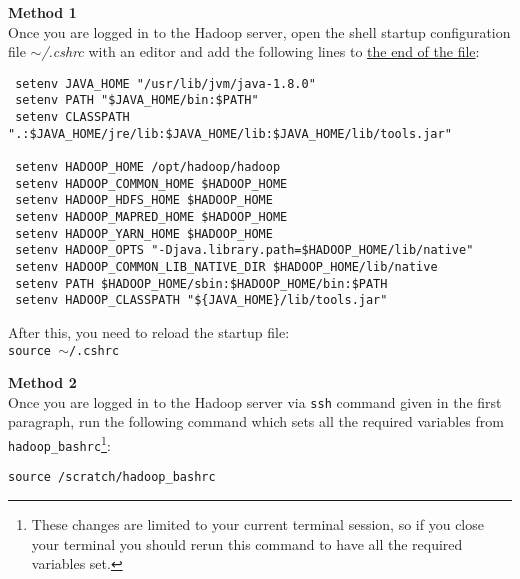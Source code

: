 \documentclass[11pt]{article}
\begin{document}
\noindent\textbf{Method 1}\\
Once you are logged in to the Hadoop server, open the shell startup configuration file $\mathtt{\sim}$\textit{/.cshrc} with an editor and add the following lines to \underline{the end of the file}:
\begin{verbatim}
 setenv JAVA_HOME "/usr/lib/jvm/java-1.8.0"
 setenv PATH "$JAVA_HOME/bin:$PATH"
 setenv CLASSPATH ".:$JAVA_HOME/jre/lib:$JAVA_HOME/lib:$JAVA_HOME/lib/tools.jar"
 
 setenv HADOOP_HOME /opt/hadoop/hadoop
 setenv HADOOP_COMMON_HOME $HADOOP_HOME
 setenv HADOOP_HDFS_HOME $HADOOP_HOME
 setenv HADOOP_MAPRED_HOME $HADOOP_HOME
 setenv HADOOP_YARN_HOME $HADOOP_HOME
 setenv HADOOP_OPTS "-Djava.library.path=$HADOOP_HOME/lib/native"
 setenv HADOOP_COMMON_LIB_NATIVE_DIR $HADOOP_HOME/lib/native
 setenv PATH $HADOOP_HOME/sbin:$HADOOP_HOME/bin:$PATH
 setenv HADOOP_CLASSPATH "${JAVA_HOME}/lib/tools.jar"
\end{verbatim}
After this, you need to reload the startup file: \\
\verb|source |$\mathtt{\sim}$\verb|/.cshrc|

\noindent\textbf{Method 2}\\
Once you are logged in to the Hadoop server via \verb|ssh| command given in the first paragraph, run the following command which sets all the required variables from \verb|hadoop_bashrc|\footnote{These changes are limited to your current terminal session, so if you close your terminal you should rerun this command to have all the required variables set.}:
\begin{verbatim}
source /scratch/hadoop_bashrc
\end{verbatim}
\end{document}

